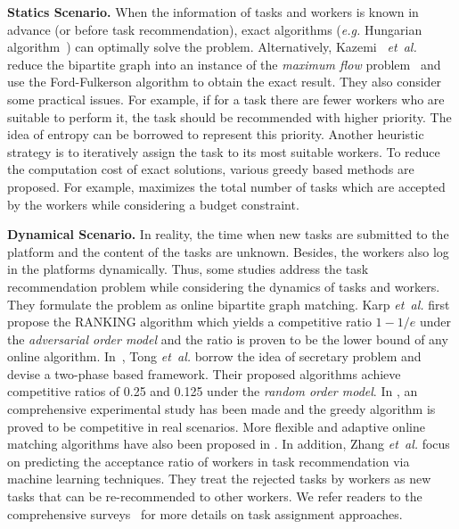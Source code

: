 \documentclass[11pt]{article}
\newcommand{\etal}{\textit{et~al.}\xspace}
\newcommand{\eg}{\textit{e.g.}\xspace}
\newcommand{\ie}{\textit{i.e.}\xspace}
\newcommand{\fakeparagraph}[1]{\vspace{1mm}\noindent\textbf{#1.}}
\begin{document}
\fakeparagraph{Statics Scenario}
When the information of tasks and workers is known in advance (or before task recommendation), exact algorithms (\eg Hungarian algorithm~) can optimally solve the problem.
Alternatively, Kazemi ~\etal \cite{DBLP:conf/gis/KazemiS12} reduce the bipartite graph into an instance of the \textit{maximum flow} problem~ and use the Ford-Fulkerson algorithm to obtain the exact result.
They also consider some practical issues.
For example, if for a task there are fewer workers who are suitable to perform it, the task should be recommended with higher priority.
The idea of entropy can be borrowed to represent this priority.
Another heuristic strategy is to iteratively assign the task to its most suitable workers.
To reduce the computation cost of exact solutions, various greedy based methods are proposed.
For example, \cite{to2016real} maximizes the total number of tasks which are accepted by the workers while considering a budget constraint.

\fakeparagraph{Dynamical Scenario}
In reality, the time when new tasks are submitted to the platform and the content of the tasks are unknown.
Besides, the workers also log in the platforms dynamically.
Thus, some studies address the task recommendation problem while considering the dynamics of tasks and workers.
They formulate the problem as online bipartite graph matching.
Karp \etal \cite{DBLP:conf/stoc/KarpVV90} first propose the RANKING algorithm which yields a competitive ratio $1-1/e$ under the \textit{adversarial order model} and the ratio is proven to be the lower bound of any online algorithm.
In~\cite{DBLP:conf/icde/TongSDWC16}, Tong \etal borrow the idea of secretary problem and devise a two-phase based framework.
Their proposed algorithms achieve competitive ratios of 0.25 and 0.125 under the \textit{random order model}.
In \cite{add-VLDB16}, an comprehensive experimental study has been made and the greedy algorithm is proved to be competitive in real scenarios.
More flexible and adaptive online matching algorithms have also been proposed in \cite{add-ICDE17, add-VLDB17, add-DASFAA18, add-ICDE19}. 
In addition, Zhang \etal \cite{DBLP:conf/kdd/ZhangHMWZFGY17} focus on predicting the acceptance ratio of workers in task recommendation via machine learning techniques.
They treat the rejected tasks by workers as new tasks that can be re-recommended to other workers.
We refer readers to the comprehensive surveys~\cite{add-VLDBJ} for more details on task assignment approaches.
\end{document}
